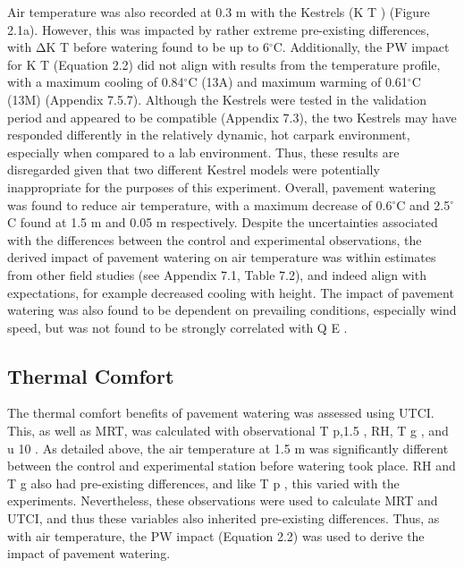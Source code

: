 \documentclass[final,3p,times,authoryear]{elsarticle}
\begin{document}
Air temperature was also recorded at 0.3 m with the Kestrels (K T ) (Figure 2.1a).
However, this was impacted by rather extreme pre-existing differences, with ΔK T before
watering found to be up to 6$^{\circ}$C. Additionally, the PW impact for K T (Equation 2.2) did not
align with results from the temperature profile, with a maximum cooling of 0.84$^{\circ}$C
(13A) and maximum warming of 0.61$^{\circ}$C (13M) (Appendix 7.5.7). Although the
Kestrels were tested in the validation period and appeared to be compatible (Appendix
7.3), the two Kestrels may have responded differently in the relatively dynamic, hot carpark environment, especially when compared to a lab environment. Thus, these
results are disregarded given that two different Kestrel models were potentially
inappropriate for the purposes of this experiment.
Overall, pavement watering was found to reduce air temperature, with a maximum
decrease of 0.6$^{\circ}$C and 2.5$^{\circ}$C found at 1.5 m and 0.05 m respectively. Despite the
uncertainties associated with the differences between the control and experimental
observations, the derived impact of pavement watering on air temperature was within
estimates from other field studies (see Appendix 7.1, Table 7.2), and indeed align with
expectations, for example decreased cooling with height. The impact of pavement
watering was also found to be dependent on prevailing conditions, especially wind
speed, but was not found to be strongly correlated with Q E .


\subsection{Thermal Comfort}\label{sec:discussion3.2}

The thermal comfort benefits of pavement watering was assessed using UTCI. This, as
well as MRT, was calculated with observational T p,1.5 , RH, T g , and u 10 . As detailed
above, the air temperature at 1.5 m was significantly different between the control and
experimental station before watering took place. RH and T g also had pre-existing
differences, and like T p , this varied with the experiments. Nevertheless, these
observations were used to calculate MRT and UTCI, and thus these variables also
inherited pre-existing differences. Thus, as with air temperature, the PW impact (Equation
2.2) was used to derive the impact of pavement watering.
\end{document}
